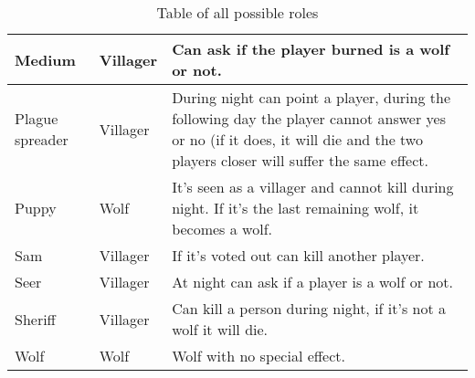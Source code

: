 \begin{center}
\begin{table}[]
\begin{tabular}{ | m{2.8cm} | m{2.5cm}| m{10cm} |}
        \hline
        \centering Medium & \centering Villager & Can ask if the player burned is a wolf or not. \\
        \hline
        \centering Plague spreader & \centering Villager & During night can point a player, during the following day the player cannot answer yes or no (if it does, it will die and the two players closer will suffer the same effect.   \\
        \hline
        \centering Puppy & \centering Wolf & It's seen as a villager and cannot kill during night. If it's the last remaining wolf, it becomes a wolf. \\
        \hline
        \centering Sam & \centering Villager & If it's voted out can kill another player. \\
        \hline
        \centering Seer & \centering Villager & At night can ask if a player is a wolf or not.\\
        \hline
        \centering Sheriff & \centering Villager & Can kill a person during night, if it's not a wolf it will die.\\
        \hline
        \centering Wolf & \centering Wolf & Wolf with no special effect.\\
        \hline
    \end{tabular}
    \label{tab:roles_table}
    \caption{Table of all possible roles}
    
    \end{table}
    
\end{center}







\begin{comment}

\textbf{Possible Roles}:\\
\begin{center}
    \begin{tabular}{|c|c|c|c|c|}
        \hline
        Wolf** & Farmer** & Knight** & Medium*  & Hamster** \\
        \hline
        Seer** & Dorky** & Bomb Disposal Engineer & Undertaker (? se c'è tempo) & Carpenter** \\
        \hline
        Hobbit** & Kamikaze** & Spy & Wizard & Berserker** (?) \\
        \hline
        Sam** & Giuda** & Illusionist** & Infected & Werewolf \\
        \hline
        Idiot & Puppy** (?) & Plague Spreader** & Piper & \\
        \hline
    \end{tabular}
\end{center}


Medium -\> (non esiste ancora la carta, può chiedere se l'utimo giocatore ucciso di giorno è un lupo o no)

\end{comment}
